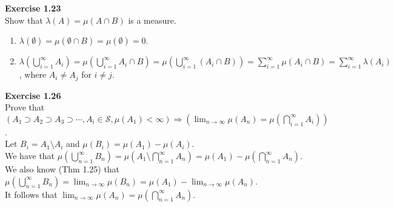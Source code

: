 \documentclass[letterpaper,12pt]{article}
\theoremstyle{definition}
\begin{document}
\noindent\textbf{Exercise 1.23}\\
Show that $\lambda(A)=\mu(A\cap B)$ is a measure.
\begin{enumerate}
\item $\lambda(\emptyset)=\mu(\emptyset\cap B)=\mu(\emptyset)=0$.
\item $\lambda(\bigcup_{i=1}^{\infty}A_i)=\mu(\bigcup_{i=1}^{\infty}A_i\cap B)=\mu(\bigcup_{i=1}^{\infty}(A_i\cap B)) = \sum_{i=1}^{\infty}\mu(A_i\cap B)=\sum_{i=1}^{\infty} \lambda(A_i)$, where $A_i\neq A_j$ for $i\neq j$.
\end{enumerate}
\bigskip

\noindent\textbf{Exercise 1.26}\\
Prove that $\left(A_{1} \supset A_{2} \supset A_{3} \supset \cdots, A_{i} \in \mathcal{S}, \mu\left(A_{1}\right)<\infty\right) \Rightarrow\left(\lim _{n \rightarrow \infty} \mu\left(A_{n}\right)=\mu\left(\bigcap_{i=1}^{\infty} A_{i}\right)\right)$.\\
Let $B_i=A_1\setminus A_i$ and $\mu(B_i)=\mu(A_1)-\mu(A_i)$.\\
We have that $\mu(\bigcup_{n=1}^{\infty} B_n)=\mu(A_1\setminus\bigcap_{n=1}^{\infty}A_n)=\mu(A_1)-\mu(\bigcap_{n=1}^{\infty}A_n)$.\\
We also know (Thm 1.25) that $\mu(\bigcup_{n=1}^{\infty} B_n)=\lim_{n\rightarrow\infty}\mu(B_n)=\mu(A_1)-\lim_{n\rightarrow\infty}\mu(A_n)$.\\
It follows that $\lim_{n\rightarrow\infty}\mu(A_n)=\mu(\bigcap_{n=1}^{\infty}A_n)$.
\end{document}
